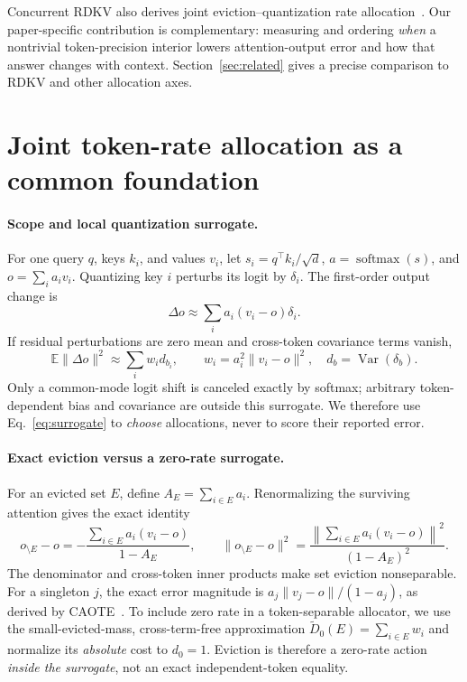 \documentclass{article}
\theoremstyle{definition}
\begin{document}
Concurrent RDKV also derives joint eviction--quantization rate allocation~\citep{zhang2026rdkv}.  Our paper-specific contribution is complementary: measuring and ordering \emph{when} a nontrivial token-precision interior lowers attention-output error and how that answer changes with context.  Section~\ref{sec:related} gives a precise comparison to RDKV and other allocation axes.

\section{Joint token-rate allocation as a common foundation}
\label{sec:framework}

\paragraph{Scope and local quantization surrogate.}
For one query $q$, keys $k_i$, and values $v_i$, let
$s_i=q^\top k_i/\sqrt d$, $a=\operatorname{softmax}(s)$, and
$o=\sum_i a_i v_i$.  Quantizing key $i$ perturbs its logit by $\delta_i$.
The first-order output change is
\begin{equation}
  \Delta o \approx \sum_i a_i(v_i-o)\delta_i .
  \label{eq:linear}
\end{equation}
If residual perturbations are zero mean and cross-token covariance terms vanish,
\begin{equation}
  \mathbb E\|\Delta o\|^2
  \approx \sum_i w_i d_{b_i}, \qquad
  w_i=a_i^2\|v_i-o\|^2,\quad d_b=\operatorname{Var}(\delta_b).
  \label{eq:surrogate}
\end{equation}
Only a common-mode logit shift is canceled exactly by softmax; arbitrary token-dependent bias and covariance are outside this surrogate.  We therefore use Eq.~\ref{eq:surrogate} to \emph{choose} allocations, never to score their reported error.

\paragraph{Exact eviction versus a zero-rate surrogate.}
For an evicted set $E$, define $A_E=\sum_{i\in E}a_i$.  Renormalizing the surviving attention gives the exact identity
\begin{equation}
 o_{\setminus E}-o
 =-\frac{\sum_{i\in E}a_i(v_i-o)}{1-A_E},\qquad
 \|o_{\setminus E}-o\|^2
 =\frac{\left\|\sum_{i\in E}a_i(v_i-o)\right\|^2}{(1-A_E)^2}.
 \label{eq:exact-eviction}
\end{equation}
The denominator and cross-token inner products make set eviction nonseparable.  For a singleton $j$, the exact error magnitude is
$a_j\|v_j-o\|/(1-a_j)$, as derived by CAOTE~\citep{goel2025caote}.
To include zero rate in a token-separable allocator, we use the small-evicted-mass, cross-term-free approximation
$\widetilde D_0(E)=\sum_{i\in E}w_i$ and normalize its \emph{absolute} cost to $d_0=1$.  Eviction is therefore a zero-rate action \emph{inside the surrogate}, not an exact independent-token equality.
\end{document}

